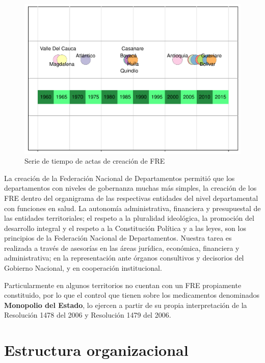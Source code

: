 \documentclass[
]{book}
\begin{document}
\begin{figure}

{\centering \includegraphics[width=1\linewidth,height=0.5\textheight]{InformeFinal_files/figure-latex/serieTiempoCreacion-1} 

}

\caption{Serie de tiempo de actas de creación de FRE}\label{fig:serieTiempoCreacion}
\end{figure}

La creación de la Federación Nacional de Departamentos permitió que los departamentos con niveles de gobernanza muchas más simples, la creación de los FRE dentro del organigrama de las respectivas entidades del nivel departamental con funciones en salud. La autonomía administrativa, financiera y presupuestal de las entidades territoriales; el respeto a la pluralidad ideológica, la promoción del desarrollo integral y el respeto a la Constitución Política y a las leyes, son los principios de la Federación Nacional de Departamentos. Nuestra tarea es realizada a través de asesorías en las áreas jurídica, económica, financiera y administrativa; en la representación ante órganos consultivos y decisorios del Gobierno Nacional, y en cooperación institucional.

Particularmente en algunos territorios no cuentan con un FRE propiamente constituido, por lo que el control que tienen sobre los medicamentos denominados \textbf{Monopolio del Estado}, lo ejercen a partir de su propia interpretación de la Resolución 1478 del 2006 y Resolución 1479 del 2006.

\hypertarget{estructura-organizacional}{%
\section{Estructura organizacional}\label{estructura-organizacional}}
\end{document}
